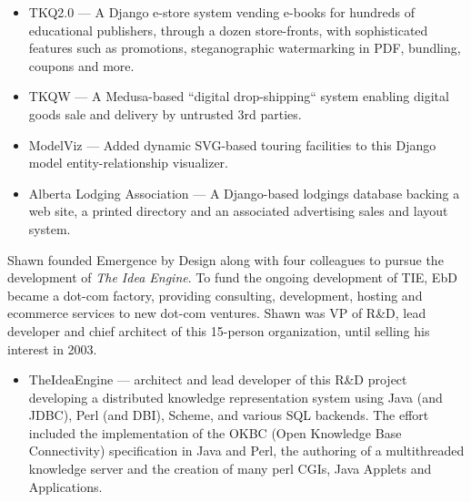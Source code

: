 \documentclass[line,margin,hidelinks]{res}
\begin{document}
\begin{resume}
\begin{position}
\begin{itemize}
  \item TKQ2.0 --- A Django e-store system vending e-books for hundreds
  of educational publishers, through a dozen store-fronts, with sophisticated
  features such as promotions, steganographic watermarking in PDF, bundling,
  coupons and more.

  \item TKQW --- A Medusa-based ``digital drop-shipping`` system
  enabling digital goods sale and delivery by untrusted 3rd parties.

  \item ModelViz --- Added dynamic SVG-based touring facilities to this Django
  model entity-relationship visualizer.

  \item Alberta Lodging Association --- A Django-based lodgings database
  backing a web site, a printed directory and an associated advertising
  sales and layout system.

\end{itemize}
\end{position}



\begin{position}
  Shawn founded Emergence by Design along with four colleagues to pursue
  the development of \emph{The Idea Engine}.  To fund the ongoing development of
  TIE, EbD became a dot-com factory, providing consulting,
  development, hosting and ecommerce services to new dot-com ventures.
  Shawn was VP of R\&D, lead developer and chief architect of this 15-person
  organization, until selling his interest in 2003.

\begin{itemize}

\item TheIdeaEngine --- architect and lead developer of this R\&D project
  developing a distributed knowledge representation system using
  Java (and JDBC), Perl (and DBI), Scheme, and various SQL backends.
  The effort included the
  implementation of the OKBC (Open Knowledge Base Connectivity)
  specification in Java and Perl,
  the authoring of a multithreaded knowledge server
  and the creation of many perl CGIs, Java Applets and Applications.


\end{itemize}
\end{position}
\end{resume}
\end{document}
